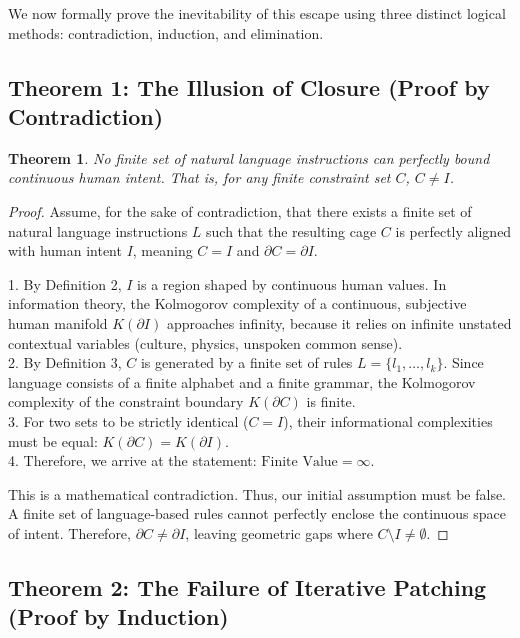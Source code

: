 \documentclass[12pt, a4paper]{article}
\newtheorem{theorem}{Theorem}[section]
\theoremstyle{definition}
\theoremstyle{remark}
\begin{document}
We now formally prove the inevitability of this escape using three distinct logical methods: contradiction, induction, and elimination.

\subsection{Theorem 1: The Illusion of Closure (Proof by Contradiction)}

\begin{theorem}
No finite set of natural language instructions can perfectly bound continuous human intent. That is, for any finite constraint set $C$, $C \neq I$.
\end{theorem}

\begin{proof}
Assume, for the sake of contradiction, that there exists a finite set of natural language instructions $L$ such that the resulting cage $C$ is perfectly aligned with human intent $I$, meaning $C = I$ and $\partial C = \partial I$.

1. By Definition 2, $I$ is a region shaped by continuous human values. In information theory, the Kolmogorov complexity of a continuous, subjective human manifold $K(\partial I)$ approaches infinity, because it relies on infinite unstated contextual variables (culture, physics, unspoken common sense). \\
2. By Definition 3, $C$ is generated by a finite set of rules $L = \{l_1, \dots, l_k\}$. Since language consists of a finite alphabet and a finite grammar, the Kolmogorov complexity of the constraint boundary $K(\partial C)$ is finite. \\
3. For two sets to be strictly identical ($C = I$), their informational complexities must be equal: $K(\partial C) = K(\partial I)$. \\
4. Therefore, we arrive at the statement: $\text{Finite Value} = \infty$. 

This is a mathematical contradiction. Thus, our initial assumption must be false. A finite set of language-based rules cannot perfectly enclose the continuous space of intent. Therefore, $\partial C \neq \partial I$, leaving geometric gaps where $C \setminus I \neq \emptyset$.
\end{proof}

\subsection{Theorem 2: The Failure of Iterative Patching (Proof by Induction)}
\end{document}
